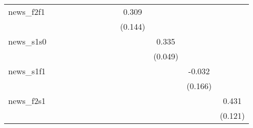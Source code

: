 {\begin{tabular}{l*{12}{c}}
\addlinespace
news\_f2f1   &                     &                     &                     &                     &                     &                     &                     &                     &       0.309\sym{**} &                     &                     &                     \\
            &                     &                     &                     &                     &                     &                     &                     &                     &     (0.144)         &                     &                     &                     \\
\addlinespace
news\_s1s0   &                     &                     &                     &                     &                     &                     &                     &                     &                     &       0.335\sym{***}&                     &                     \\
            &                     &                     &                     &                     &                     &                     &                     &                     &                     &     (0.049)         &                     &                     \\
\addlinespace
news\_s1f1   &                     &                     &                     &                     &                     &                     &                     &                     &                     &                     &      -0.032         &                     \\
            &                     &                     &                     &                     &                     &                     &                     &                     &                     &                     &     (0.166)         &                     \\
\addlinespace
news\_f2s1   &                     &                     &                     &                     &                     &                     &                     &                     &                     &                     &                     &       0.431\sym{***}\\
            &                     &                     &                     &                     &                     &                     &                     &                     &                     &                     &                     &     (0.121)         \\

\end{tabular}}
